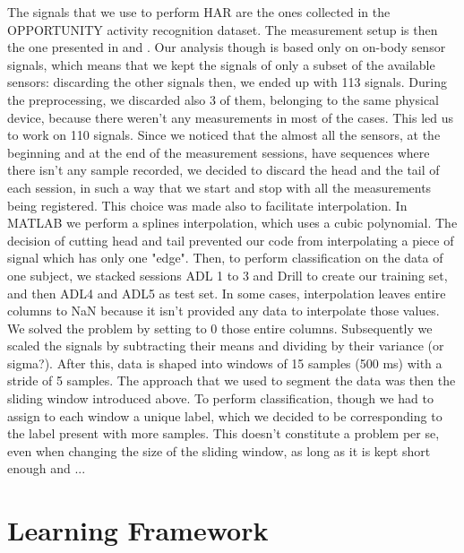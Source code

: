 The signals that we use to perform HAR are the ones collected in the OPPORTUNITY activity recognition dataset. The measurement setup is then the one presented in \cite{Roggen2010} and \cite{Chavarriaga2015}. Our analysis though is based only on on-body sensor signals, which means that we kept the signals of only a subset of the available sensors: discarding the other signals then, we ended up with 113 signals. During the preprocessing, we discarded also 3 of them, belonging to the same physical device, because there weren't any measurements in most of the cases. This led us to work on 110 signals.
Since we noticed that the almost all the sensors, at the beginning and at the end of the measurement sessions, have sequences where there isn't any sample recorded, we decided to discard the head and the tail of each session, in such a way that we start and stop with all the measurements being registered.
This choice was made also to facilitate interpolation. In MATLAB we perform a splines interpolation, which uses a cubic polynomial. The decision of cutting head and tail prevented our code from interpolating a piece of signal which has only one "edge".
Then, to perform classification on the data of one subject, we stacked sessions ADL 1 to 3 and Drill to create our training set, and then ADL4 and ADL5 as test set. In some cases, interpolation leaves entire columns to NaN because it isn't provided any data to interpolate those values. We solved the problem by setting to 0 those entire columns.
Subsequently we scaled the signals by subtracting their means and dividing by their variance (or sigma?). After this, data is shaped into windows of 15 samples (500 ms) with a stride of 5 samples. The approach that we used to segment the data was then the sliding window introduced above. To perform classification, though we had to assign to each window a unique label, which we decided to be corresponding to the label present with more samples. This doesn't constitute a problem per se, even when changing the size of the sliding window, as long as it is kept short enough and ...


\section{Learning Framework}
\label{sec:learning_framework}


